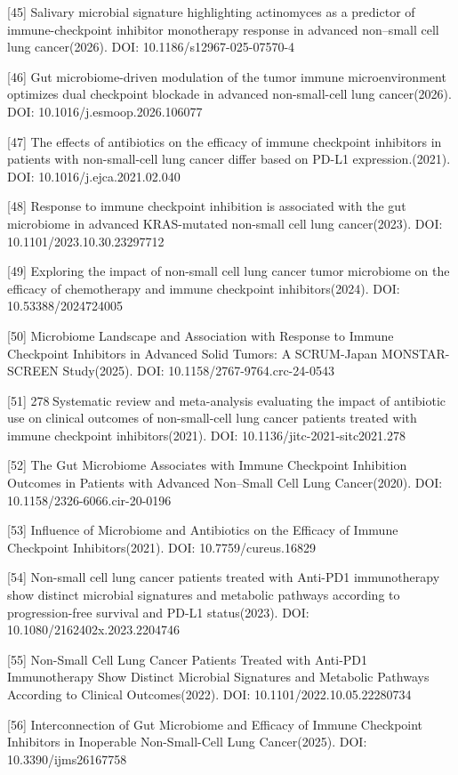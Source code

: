 {[}45{]} Salivary microbial signature highlighting actinomyces as a predictor of immune-checkpoint inhibitor monotherapy response in advanced non--small cell lung cancer(2026). DOI: 10.1186/s12967-025-07570-4

{[}46{]} Gut microbiome-driven modulation of the tumor immune microenvironment optimizes dual checkpoint blockade in advanced non-small-cell lung cancer(2026). DOI: 10.1016/j.esmoop.2026.106077

{[}47{]} The effects of antibiotics on the efficacy of immune checkpoint inhibitors in patients with non-small-cell lung cancer differ based on PD-L1 expression.(2021). DOI: 10.1016/j.ejca.2021.02.040

{[}48{]} Response to immune checkpoint inhibition is associated with the gut microbiome in advanced KRAS-mutated non-small cell lung cancer(2023). DOI: 10.1101/2023.10.30.23297712

{[}49{]} Exploring the impact of non-small cell lung cancer tumor microbiome on the efficacy of chemotherapy and immune checkpoint inhibitors(2024). DOI: 10.53388/2024724005

{[}50{]} Microbiome Landscape and Association with Response to Immune Checkpoint Inhibitors in Advanced Solid Tumors: A SCRUM-Japan MONSTAR-SCREEN Study(2025). DOI: 10.1158/2767-9764.crc-24-0543

{[}51{]} 278 Systematic review and meta-analysis evaluating the impact of antibiotic use on clinical outcomes of non-small-cell lung cancer patients treated with immune checkpoint inhibitors(2021). DOI: 10.1136/jitc-2021-sitc2021.278

{[}52{]} The Gut Microbiome Associates with Immune Checkpoint Inhibition Outcomes in Patients with Advanced Non--Small Cell Lung Cancer(2020). DOI: 10.1158/2326-6066.cir-20-0196

{[}53{]} Influence of Microbiome and Antibiotics on the Efficacy of Immune Checkpoint Inhibitors(2021). DOI: 10.7759/cureus.16829

{[}54{]} Non-small cell lung cancer patients treated with Anti-PD1 immunotherapy show distinct microbial signatures and metabolic pathways according to progression-free survival and PD-L1 status(2023). DOI: 10.1080/2162402x.2023.2204746

{[}55{]} Non-Small Cell Lung Cancer Patients Treated with Anti-PD1 Immunotherapy Show Distinct Microbial Signatures and Metabolic Pathways According to Clinical Outcomes(2022). DOI: 10.1101/2022.10.05.22280734

{[}56{]} Interconnection of Gut Microbiome and Efficacy of Immune Checkpoint Inhibitors in Inoperable Non-Small-Cell Lung Cancer(2025). DOI: 10.3390/ijms26167758

